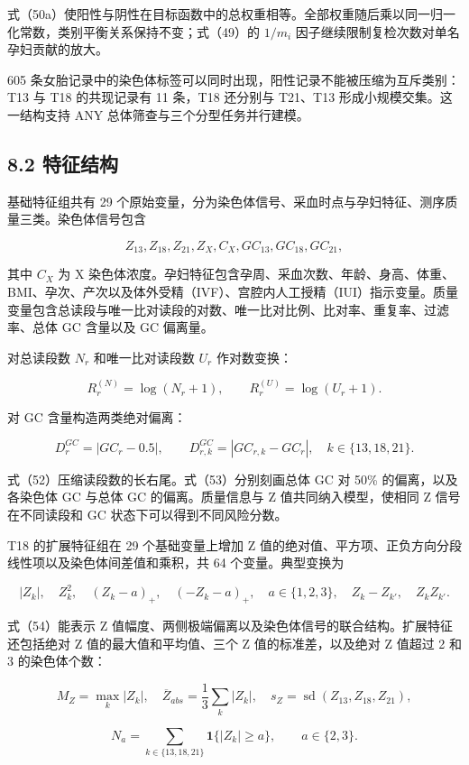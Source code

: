 \documentclass[UTF8,fontset=fandol,zihao=-4,a4paper]{ctexart}
\begin{document}
式（50a）使阳性与阴性在目标函数中的总权重相等。全部权重随后乘以同一归一化常数，类别平衡关系保持不变；式（49）的
\(1/m_i\) 因子继续限制复检次数对单名孕妇贡献的放大。

605 条女胎记录中的染色体标签可以同时出现，阳性记录不能被压缩为互斥类别：T13
与 T18 的共现记录有 11 条，T18 还分别与 T21、T13
形成小规模交集。这一结构支持 ANY 总体筛查与三个分型任务并行建模。

\subsection{8.2 特征结构}\label{ux7279ux5f81ux7ed3ux6784}

基础特征组共有 29
个原始变量，分为染色体信号、采血时点与孕妇特征、测序质量三类。染色体信号包含

\[
Z_{13},Z_{18},Z_{21},Z_X,C_X,
GC_{13},GC_{18},GC_{21},
\tag{51}
\]

其中 \(C_X\) 为 X
染色体浓度。孕妇特征包含孕周、采血次数、年龄、身高、体重、BMI、孕次、产次以及体外受精（IVF）、宫腔内人工授精（IUI）指示变量。质量变量包含总读段与唯一比对读段的对数、唯一比对比例、比对率、重复率、过滤率、总体
GC 含量以及 GC 偏离量。

对总读段数 \(N_r\) 和唯一比对读段数 \(U_r\) 作对数变换：

\[
R_r^{(N)}=\log(N_r+1),
\qquad
R_r^{(U)}=\log(U_r+1).
\tag{52}
\]

对 GC 含量构造两类绝对偏离：

\[
D_r^{GC}=|GC_r-0.5|,
\qquad
D_{r,k}^{GC}=|GC_{r,k}-GC_r|,
\quad k\in\{13,18,21\}.
\tag{53}
\]

式（52）压缩读段数的长右尾。式（53）分别刻画总体 GC 对 50\%
的偏离，以及各染色体 GC 与总体 GC 的偏离。质量信息与 Z
值共同纳入模型，使相同 Z 信号在不同读段和 GC
状态下可以得到不同风险分数。

T18 的扩展特征组在 29 个基础变量上增加 Z
值的绝对值、平方项、正负方向分段线性项以及染色体间差值和乘积，共 64
个变量。典型变换为

\[
|Z_k|,\quad Z_k^2,\quad
(Z_k-a)_+,\quad(-Z_k-a)_+,\quad a\in\{1,2,3\},
\quad Z_k-Z_{k'},\quad Z_kZ_{k'}.
\tag{54}
\]

式（54）能表示 Z
值幅度、两侧极端偏离以及染色体信号的联合结构。扩展特征还包括绝对 Z
值的最大值和平均值、三个 Z 值的标准差，以及绝对 Z 值超过 2 和 3
的染色体个数：

\[
M_Z=\max_k|Z_k|,
\quad
\overline Z_{abs}=\frac13\sum_k|Z_k|,
\quad
s_Z=\operatorname{sd}(Z_{13},Z_{18},Z_{21}),
\]

\[
N_a=\sum_{k\in\{13,18,21\}}\mathbf1\{|Z_k|\ge a\},
\qquad a\in\{2,3\}.
\]
\end{document}
